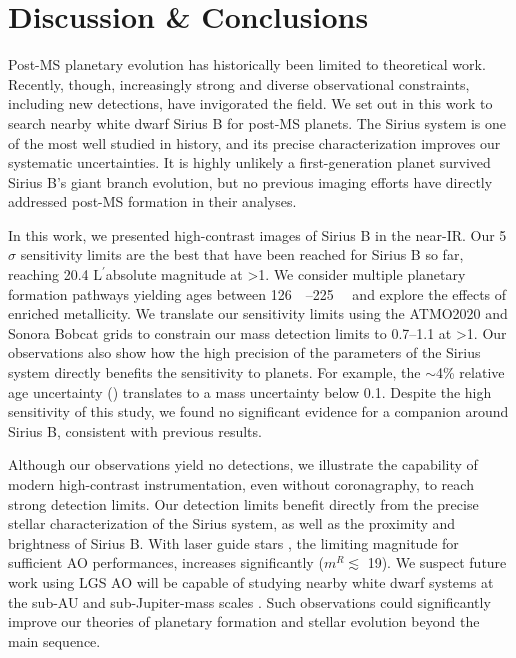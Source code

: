 \documentclass[twocolumn,linenumbers]{aastex631}
\newcommand\Lp{$\mathrm{L}^\prime$}
\begin{document}
\section{Discussion \& Conclusions}\label{sec:conclusion}

Post-MS planetary evolution has historically been limited to theoretical work. Recently, though, increasingly strong and diverse observational constraints, including new detections, have invigorated the field. We set out in this work to search nearby white dwarf Sirius B for post-MS planets. The Sirius system is one of the most well studied in history, and its precise characterization improves our systematic uncertainties. It is highly unlikely a first-generation planet survived Sirius B's giant branch evolution, but no previous imaging efforts have directly addressed post-MS formation in their analyses.

In this work, we presented high-contrast images of Sirius B in the near-IR. Our 5$\sigma$ sensitivity limits are the best that have been reached for Sirius B so far, reaching \num{20.4} \Lp absolute magnitude at \textgreater\qty{1}{\au}. We consider multiple planetary formation pathways yielding ages between \qtyrange{126}{225}{\mega\year} and explore the effects of enriched metallicity. We translate our sensitivity limits using the ATMO2020 and Sonora Bobcat grids to constrain our mass detection limits to \qtyrange{0.7}{1.1}{\jupitermass} at \textgreater\qty{1}{\au}. Our observations also show how the high precision of the parameters of the Sirius system directly benefits the sensitivity to planets. For example, the $\sim$4\% relative age uncertainty () translates to a mass uncertainty below \qty{0.1}{\jupitermass}. Despite the high sensitivity of this study, we found no significant evidence for a companion around Sirius B, consistent with previous results.

Although our observations yield no detections, we illustrate the capability of modern high-contrast instrumentation, even without coronagraphy, to reach strong detection limits. Our detection limits benefit directly from the precise stellar characterization of the Sirius system, as well as the proximity and brightness of Sirius B. With laser guide stars \citep[LGS; e.g.,][]{vandamKeckObservatoryLaser2006,baranecRoboAO2FacilityRapid2018}, the limiting magnitude for sufficient AO performances, increases significantly ($m^R\lesssim$ \num{19}). We suspect future work using LGS AO will be capable of studying nearby white dwarf systems at the sub-AU and sub-Jupiter-mass scales \citep{holberg25ParsecLocal2016}. Such observations could significantly improve our theories of planetary formation and stellar evolution beyond the main sequence.
\end{document}
